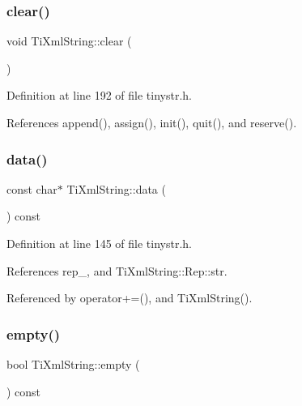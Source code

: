 \subsubsection{\texorpdfstring{clear()}{clear()}}
{\footnotesize\ttfamily void Ti\+Xml\+String\+::clear (\begin{DoxyParamCaption}{ }\end{DoxyParamCaption})\hspace{0.3cm}{\ttfamily [inline]}}



Definition at line 192 of file tinystr.\+h.



References append(), assign(), init(), quit(), and reserve().

\hypertarget{class_ti_xml_string_a0e010e1737cfc3ee885b42875171b88e}{}\label{class_ti_xml_string_a0e010e1737cfc3ee885b42875171b88e} 
\subsubsection{\texorpdfstring{data()}{data()}}
{\footnotesize\ttfamily const char$\ast$ Ti\+Xml\+String\+::data (\begin{DoxyParamCaption}{ }\end{DoxyParamCaption}) const\hspace{0.3cm}{\ttfamily [inline]}}



Definition at line 145 of file tinystr.\+h.



References rep\+\_\+, and Ti\+Xml\+String\+::\+Rep\+::str.



Referenced by operator+=(), and Ti\+Xml\+String().

\hypertarget{class_ti_xml_string_a3139aafb0f0a8e26d1a4ed58a50f3678}{}\label{class_ti_xml_string_a3139aafb0f0a8e26d1a4ed58a50f3678} 
\subsubsection{\texorpdfstring{empty()}{empty()}}
{\footnotesize\ttfamily bool Ti\+Xml\+String\+::empty (\begin{DoxyParamCaption}{ }\end{DoxyParamCaption}) const\hspace{0.3cm}{\ttfamily [inline]}}



